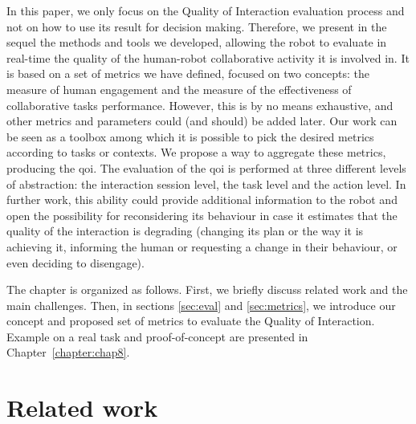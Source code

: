 \documentclass[a4paper,11pt,twoside]{StyleThese}
\begin{document}
In this paper, we only focus on the Quality of Interaction evaluation process and not on how to use its result for decision making. Therefore,  we present in the sequel the methods and tools we developed, allowing the robot to evaluate in real-time the quality of the human-robot collaborative activity it is involved in. It is based on a set of metrics we have defined, focused on two concepts: the measure of human engagement and the measure of the effectiveness of collaborative tasks performance. However, this is by no means exhaustive, and other metrics and parameters could (and should) be added later. Our work can be seen as a toolbox among which it is possible to pick the desired metrics according to tasks or contexts. We propose a way to aggregate these metrics, producing the \acrshort{qoi}. The evaluation of the \acrshort{qoi} is performed at three different levels of abstraction: the interaction session level, the task level and the action level. In further work, this ability could provide additional information to the robot and open the possibility for reconsidering its behaviour in case it estimates that the quality of the interaction is degrading (\eg changing its plan or the way it is achieving it, informing the human or requesting a change in their behaviour, or even deciding to disengage).

The chapter is organized as follows. First, we briefly discuss related work and the main challenges. Then, in sections \ref{sec:eval} and \ref{sec:metrics}, we introduce our concept and proposed set of metrics to evaluate the Quality of Interaction. Example on a real task and proof-of-concept are presented in Chapter~\ref{chapter:chap8}.

\section{Related work}\label{sec:rel}
\end{document}
